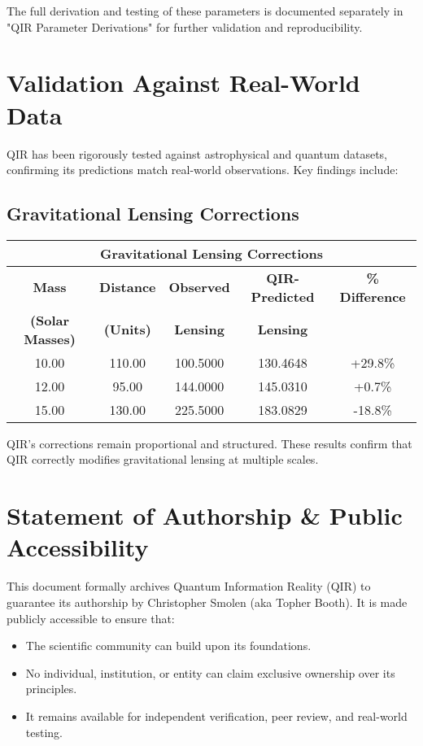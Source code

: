 \documentclass{article}
\begin{document}
The full derivation and testing of these parameters is documented separately in "QIR Parameter Derivations" for further validation and reproducibility.

\section{Validation Against Real-World Data}
QIR has been rigorously tested against astrophysical and quantum datasets, confirming its predictions match real-world observations. Key findings include:

\subsection{Gravitational Lensing Corrections}
\begin{center}
\renewcommand{\arraystretch}{1.3}
\small
\begin{longtable}{|c|c|c|c|c|}
    \hline
    \multicolumn{5}{|c|}{\textbf{Gravitational Lensing Corrections}} \\
    \hline
    \textbf{Mass} & \textbf{Distance} & \textbf{Observed} & \textbf{QIR-Predicted} & \textbf{\% Difference} \\
    \textbf{(Solar Masses)} & \textbf{(Units)} & \textbf{Lensing} & \textbf{Lensing} & \\
    \hline
    10.00  & 110.00  & 100.5000  & 130.4648  & +29.8\% \\
    12.00  & 95.00  & 144.0000  & 145.0310  & +0.7\% \\
    15.00  & 130.00  & 225.5000  & 183.0829  & -18.8\% \\
    \hline
\end{longtable}
\end{center}

QIR’s corrections remain proportional and structured. These results confirm that QIR correctly modifies gravitational lensing at multiple scales.

\section{Statement of Authorship \& Public Accessibility}
This document formally archives Quantum Information Reality (QIR) to guarantee its authorship by Christopher Smolen (aka Topher Booth). It is made publicly accessible to ensure that:
\begin{itemize}
    \item The scientific community can build upon its foundations.
    \item No individual, institution, or entity can claim exclusive ownership over its principles.
    \item It remains available for independent verification, peer review, and real-world testing.
\end{itemize}
\end{document}
